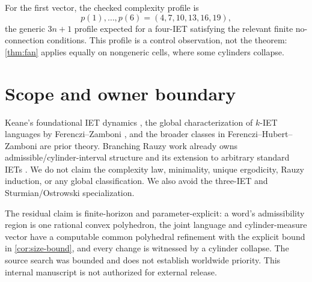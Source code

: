 \documentclass[11pt,a4paper]{amsart}
\theoremstyle{definition}
\theoremstyle{remark}
\begin{document}
For the first vector, the checked complexity profile is
\[
 p(1),\ldots,p(6)=(4,7,10,13,16,19),
\]
the generic $3n+1$ profile expected for a four-IET satisfying the relevant
finite no-connection conditions.  This profile is a control observation, not
the theorem: \cref{thm:fan} applies equally on nongeneric cells, where some
cylinders collapse.

\section{Scope and owner boundary}

Keane's foundational IET dynamics \cite{Keane1975}, the global
characterization of $k$-IET languages by Ferenczi--Zamboni
\cite{FerencziZamboni2008}, and the broader classes in
Ferenczi--Hubert--Zamboni \cite{FerencziHubertZamboni2026} are prior theory.
Branching Rauzy work already owns admissible/cylinder-interval structure and
its extension to arbitrary standard IETs
\cite{DolcePerrin2017,DolceHughes2025}.
We do not claim the complexity law, minimality, unique ergodicity, Rauzy
induction, or any global classification.  We also avoid the three-IET and
Sturmian/Ostrowski specialization.

The residual claim is finite-horizon and parameter-explicit: a word's
admissibility region is one rational convex polyhedron, the joint language
and cylinder-measure vector have a computable common polyhedral refinement
with the explicit bound in \cref{cor:size-bound}, and every change is
witnessed by a cylinder collapse.  The source search was bounded and does not
establish worldwide priority.  This internal manuscript is not authorized
for external release.



\end{document}
